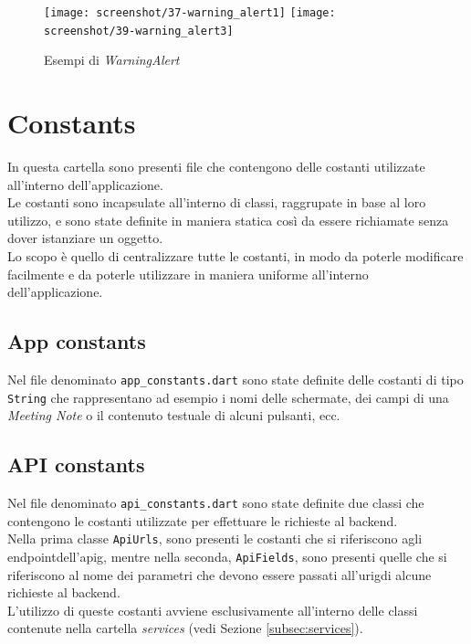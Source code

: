 \begin{figure}[!h] 
    \centering 
    \texttt{[image: screenshot/37-warning\_alert1]}
    \hfill
    \texttt{[image: screenshot/39-warning\_alert3]} 
    \caption{Esempi di \emph{WarningAlert}}
    \label{fig:warning-alert}
\end{figure}

\section{Constants}
\label{sec:constants}

In questa cartella sono presenti file che contengono delle costanti utilizzate all'interno dell'applicazione.\\
Le costanti sono incapsulate all'interno di classi, raggrupate in base al loro utilizzo, e sono state definite in maniera statica così da essere richiamate senza dover istanziare un oggetto.\\
Lo scopo è quello di centralizzare tutte le costanti, in modo da poterle modificare facilmente e da poterle utilizzare in maniera uniforme all'interno dell'applicazione.

\subsection{App constants}
\label{subsec:app-constants}

Nel file denominato \lstinline{app_constants.dart} sono state definite delle costanti di tipo \lstinline{String} che rappresentano ad esempio i nomi delle schermate, dei campi di una \emph{Meeting Note} o il contenuto testuale di alcuni pulsanti, ecc.

\subsection{API constants}
\label{subsec:api-constants}

Nel file denominato \lstinline{api_constants.dart} sono state definite due classi che contengono le costanti utilizzate per effettuare le richieste al \gls{backend}\glsoccur.\\
Nella prima classe \lstinline{ApiUrls}, sono presenti le costanti che si riferiscono agli \gls{endpoint}\glsoccur dell'\gls{apig}\glsoccur, mentre nella seconda, \lstinline{ApiFields}, sono presenti quelle che si riferiscono al nome dei parametri che devono essere passati all'\gls{urig}\glsoccur di alcune richieste al \gls{backend}\glsoccur. \\
L'utilizzo di queste costanti avviene esclusivamente all'interno delle classi contenute nella cartella \emph{services} (vedi Sezione \ref{subsec:services}).

